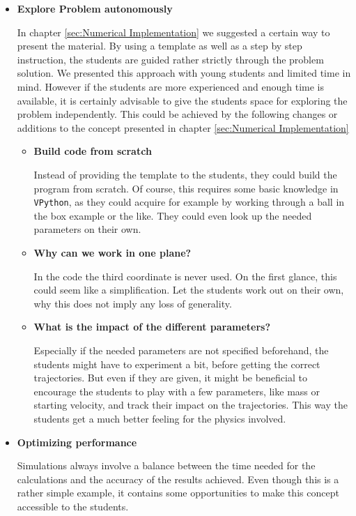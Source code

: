 \documentclass[12pt]{iopart}
\begin{document}
\begin{itemize}

\item \textbf{Explore Problem autonomously}

In chapter \ref{sec:Numerical Implementation} we suggested a certain way to present the material. By using a template as well as a step by step instruction, the students are guided rather strictly through the problem solution. We presented this approach with young students and limited time in mind. However if the students are more experienced and enough time is available, it is certainly advisable to give the students space for exploring the problem independently. This could be achieved by the following changes or additions to the concept presented in chapter \ref{sec:Numerical Implementation}

\begin{itemize}
\item \textbf{Build code from scratch}

Instead of providing the template to the students, they could build the program from scratch. Of course, this requires some basic knowledge in \texttt{VPython}, as they could acquire for example by working through a ball in the box example or the like. They could even look up the needed parameters on their own.
\item \textbf{Why can we work in one plane?}

In the code the third coordinate is never used. On the first glance, this could seem like a simplification. Let the students work out on their own, why this does not imply any loss of generality.
\item \textbf{What is the impact of the different parameters?}

Especially if the needed parameters are not specified beforehand, the students might have to experiment a bit, before getting the correct trajectories. But even if they are given, it might be beneficial to encourage the students to play with a few parameters, like mass or starting velocity, and track their impact on the trajectories. This way the students get a much better feeling for the physics involved.
\end{itemize}

\item \textbf{Optimizing performance}

Simulations always involve a balance between the time needed for the calculations and the accuracy of the results achieved. Even though this is a rather simple example, it contains some opportunities to make this concept accessible to the students.


\end{itemize}
\end{document}
